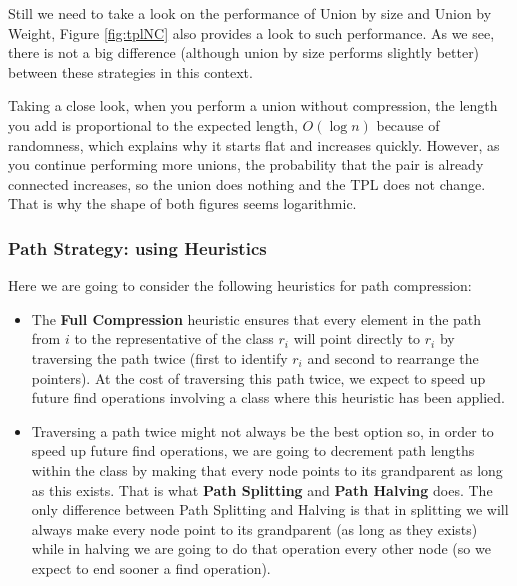 Still we need to take a look on the performance of Union by size and Union by Weight, Figure \ref{fig:tplNC} also provides a look to such performance. As we see, there is not a big difference (although union by size performs slightly better) between these strategies in this context.



Taking a close look, when you perform a union without compression, the length you add is proportional to the expected length, \(O(\log n)\) because of randomness, which explains why it starts flat and increases quickly. However, as you continue performing more unions, the probability that the pair is already connected increases, so the union does nothing and the TPL does not change. That is why the shape of both figures seems logarithmic.

\subsubsection{Path Strategy: using Heuristics}

Here we are going to consider the following heuristics for path compression:

\begin{itemize}
    \item The \textbf{Full Compression} heuristic ensures that every element in the path from \( i \) to the representative of the class \( r_i \) will point directly to \( r_i \) by traversing the path twice (first to identify \( r_i \) and second to rearrange the pointers). At the cost of traversing this path twice, we expect to speed up future find operations involving a class where this heuristic has been applied. 
    \item Traversing a path twice might not always be the best option so, in order to speed up future find operations, we are going to decrement path lengths within the class by making that every node points to its grandparent as long as this exists. That is what \textbf{Path Splitting} and \textbf{Path Halving} does. The only difference between Path Splitting and Halving is that in splitting we will always make every node point to its grandparent (as long as they exists) while in halving we are going to do that operation every other node (so we expect to end sooner a find operation).
\end{itemize}


